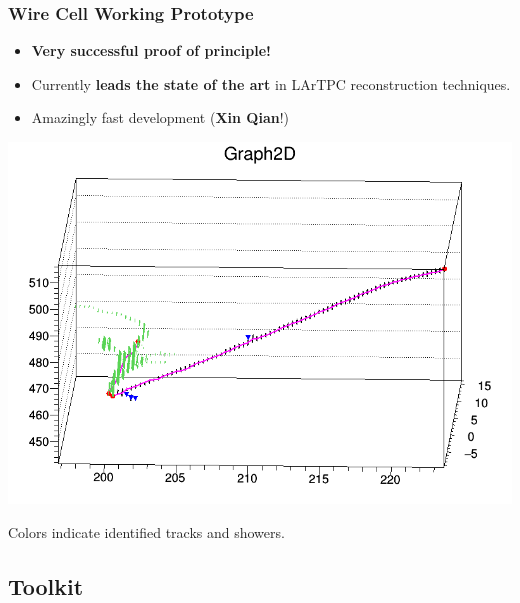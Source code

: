 \begin{frame}
  \frametitle{Wire Cell Working Prototype}
  \footnotesize

  \begin{itemize}
  \item \textbf{Very successful proof of principle!}
  \item Currently \textbf{leads the state of the art} in LArTPC
    reconstruction techniques.
  \item Amazingly fast development (\textbf{Xin Qian}!)
  \end{itemize}

  \begin{center}
    \includegraphics[height=0.5\textheight,trim=0cm 0cm 0cm 2cm,clip]{xin-shower.png}

    \scriptsize
    Colors indicate identified tracks and showers.
  \end{center}

\end{frame}

\subsection{Toolkit}

